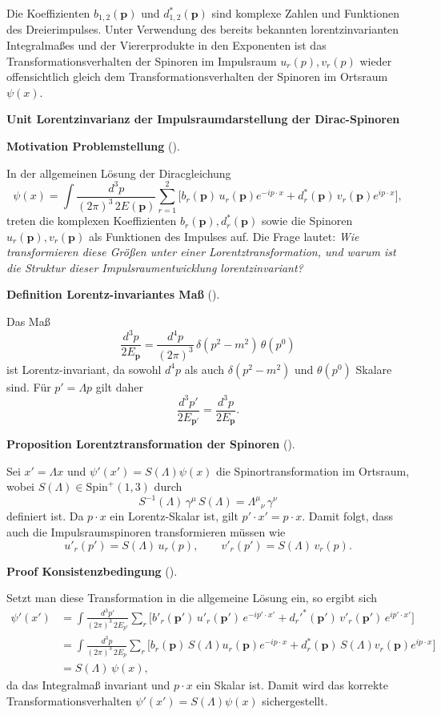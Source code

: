 \documentclass[10pt, letterpaper]{article}
\newcommand{\Spin}{\mathrm{Spin}}
\newcommand{\CustomHeading}[3]{%
  \par\medskip\noindent%
  \textbf{#1 #2} \textnormal{(#3)}.\enskip%
}
\newenvironment{DEF}[2]{\begin{unitbox}\CustomHeading{Definition}{#1}{#2}}{\end{unitbox}}
\newenvironment{PROP}[2]{\begin{unitbox}\CustomHeading{Proposition}{#1}{#2}}{\end{unitbox}}
\newenvironment{MOT}[2]{\begin{unitbox}\CustomHeading{Motivation}{#1}{#2}}{\end{unitbox}}
\newenvironment{PROOF}[2]{\begin{unitbox}\CustomHeading{Proof}{#1}{#2}}{\end{unitbox}}
\newenvironment{unit}[1]
  {\begin{unitbox}\textbf{Unit #1}\par\smallskip}
  {\end{unitbox}}
\begin{document}
Die Koeffizienten $b_{1,2}(\mathbf{p})$ und $d_{1,2}^{*}(\mathbf{p})$ sind komplexe Zahlen und Funktionen des Dreierimpulses. Unter Verwendung des bereits bekannten lorentzinvarianten Integralmaßes und der Viererprodukte in den Exponenten ist das Transformationsverhalten der Spinoren im Impulsraum $u_{r}(p), v_{r}(p)$ wieder offensichtlich gleich dem Transformationsverhalten der Spinoren im Ortsraum $\psi(x)$.

\begin{unit}{Lorentzinvarianz der Impulsraumdarstellung der Dirac-Spinoren}

\begin{MOT}{Problemstellung}{}
In der allgemeinen Lösung der Diracgleichung
\[
\psi(x)
=\int \frac{d^3p}{(2\pi)^3\,2E(\mathbf p)}
\sum_{r=1}^2
\Big[b_r(\mathbf p)\,u_r(\mathbf p)e^{-ip\cdot x}
+d_r^*(\mathbf p)\,v_r(\mathbf p)e^{ip\cdot x}\Big],
\]
treten die komplexen Koeffizienten $b_r(\mathbf p),d_r^*(\mathbf p)$ sowie die Spinoren $u_r(\mathbf p),v_r(\mathbf p)$ als Funktionen des Impulses auf.  
Die Frage lautet: \emph{Wie transformieren diese Größen unter einer Lorentztransformation, und warum ist die Struktur dieser Impulsraumentwicklung lorentzinvariant?}
\end{MOT}

\begin{DEF}{Lorentz-invariantes Maß}{}
Das Maß
\[
\frac{d^3p}{2E_{\mathbf p}}
=\frac{d^4p}{(2\pi)^3}\,\delta(p^2-m^2)\,\theta(p^0)
\]
ist Lorentz-invariant, da sowohl $d^4p$ als auch $\delta(p^2-m^2)$ und $\theta(p^0)$ Skalare sind.  
Für $p'=\Lambda p$ gilt daher
\[
\frac{d^3p'}{2E_{\mathbf p'}}=\frac{d^3p}{2E_{\mathbf p}}.
\]
\end{DEF}

\begin{PROP}{Lorentztransformation der Spinoren}{}
Sei $x'=\Lambda x$ und $\psi'(x')=S(\Lambda)\psi(x)$ die Spinortransformation im Ortsraum, wobei $S(\Lambda)\in\Spin^+(1,3)$ durch
\[
S^{-1}(\Lambda)\,\gamma^\mu\,S(\Lambda)=\Lambda^\mu{}_\nu\,\gamma^\nu
\]
definiert ist.
Da $p\cdot x$ ein Lorentz-Skalar ist, gilt $p'\!\cdot\! x'=p\!\cdot\! x$.  
Damit folgt, dass auch die Impulsraumspinoren transformieren müssen wie
\[
\boxed{
u'_r(p')=S(\Lambda)\,u_r(p),\qquad
v'_r(p')=S(\Lambda)\,v_r(p).
}
\]
\end{PROP}

\begin{PROOF}{Konsistenzbedingung}{}
Setzt man diese Transformation in die allgemeine Lösung ein, so ergibt sich
\[
\begin{aligned}
\psi'(x')
&=\int\!\frac{d^3p'}{(2\pi)^3\,2E_{p'}}
\sum_r
\Big[b'_r(\mathbf p')\,u'_r(\mathbf p')\,e^{-ip'\cdot x'}
+d_r'^{*}(\mathbf p')\,v'_r(\mathbf p')\,e^{ip'\cdot x'}\Big]\\[4pt]
&=\int\!\frac{d^3p}{(2\pi)^3\,2E_p}\sum_r
\Big[b_r(\mathbf p)\,S(\Lambda)u_r(\mathbf p)e^{-ip\cdot x}
+d_r^*(\mathbf p)\,S(\Lambda)v_r(\mathbf p)e^{ip\cdot x}\Big]\\[4pt]
&=S(\Lambda)\,\psi(x),
\end{aligned}
\]
da das Integralmaß invariant und $p\!\cdot\!x$ ein Skalar ist.
Damit wird das korrekte Transformationsverhalten $\psi'(x')=S(\Lambda)\psi(x)$ sichergestellt.
\end{PROOF}


\end{unit}
\end{document}
